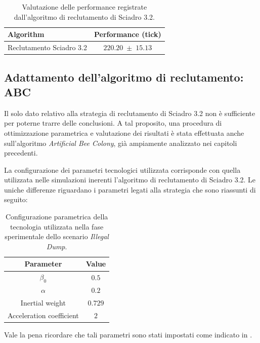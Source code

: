 \begin{table}[H]
    \centering
    \captionsetup{justification=centering, margin=2cm, font=footnotesize}
    \begin{tabular}{|l|c|}
    \hline
    \textbf{Algorithm}              & \textbf{Performance (tick)}              \\ \hline
    Reclutamento Sciadro 3.2        & $220.20 \; \pm \; 15.13$           \\ \hline
    \end{tabular}%
    
    \caption{Valutazione delle performance registrate dall'algoritmo di reclutamento di Sciadro 3.2.}
    \label{tabella_performance_dump}
\end{table}

\subsection{Adattamento dell'algoritmo di reclutamento: \\ABC}

Il solo dato relativo alla strategia di reclutamento di Sciadro 3.2 non è sufficiente per poterne trarre delle conclusioni.
A tal proposito, una procedura di ottimizzazione parametrica e valutazione dei risultati è stata effettuata anche sull'algoritmo \textit{Artificial Bee Colony}, già ampiamente analizzato nei capitoli precedenti.

La configurazione dei parametri tecnologici utilizzata corrisponde con quella utilizzata nelle simulazioni inerenti l'algoritmo di reclutamento di Sciadro 3.2.
Le uniche differenze riguardano i parametri legati alla strategia che sono riassunti di seguito:

\begin{table}[H]
    \centering
    \captionsetup{justification=centering, margin=2cm, font=footnotesize}
    \begin{tabular}{|c|c|}
    \hline
    \textbf{Parameter}                      & \textbf{Value}        \\ \hline
    $\beta_{0}$                             & $0.5$                 \\ \hline
    $\alpha$                                & $0.2$                 \\ \hline
    Inertial weight                         & $0.729$               \\ \hline
    Acceleration coefficient                & $2$                   \\ \hline
    \end{tabular}%
    
    \caption{Configurazione parametrica della tecnologia utilizzata nella fase sperimentale dello scenario \textit{Illegal Dump}.}
    \label{tabella_parametri_dump_ABC}
\end{table}
Vale la pena ricordare che tali parametri sono stati impostati come indicato in \cite{palmieri2017comparison}.


